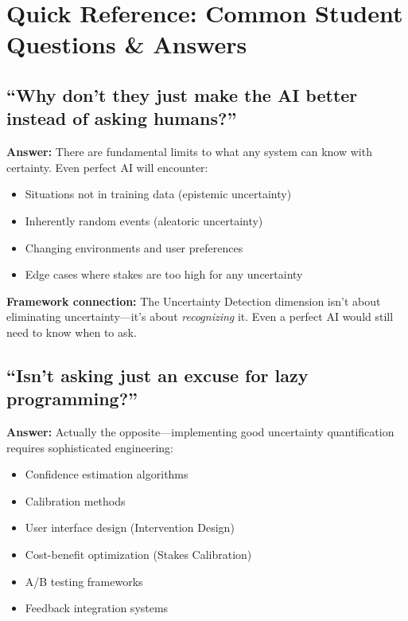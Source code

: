 \section{Quick Reference: Common Student Questions \& Answers}

\subsection{``Why don't they just make the AI better instead of asking humans?''}

\textbf{Answer:} There are fundamental limits to what any system can know with certainty. Even perfect AI will encounter:
\begin{itemize}
    \item Situations not in training data (epistemic uncertainty)
    \item Inherently random events (aleatoric uncertainty)
    \item Changing environments and user preferences
    \item Edge cases where stakes are too high for any uncertainty
\end{itemize}

\textbf{Framework connection:} The Uncertainty Detection dimension isn't about eliminating uncertainty---it's about \emph{recognizing} it. Even a perfect AI would still need to know when to ask.

\subsection{``Isn't asking just an excuse for lazy programming?''}

\textbf{Answer:} Actually the opposite---implementing good uncertainty quantification requires sophisticated engineering:
\begin{itemize}
    \item Confidence estimation algorithms
    \item Calibration methods
    \item User interface design (Intervention Design)
    \item Cost-benefit optimization (Stakes Calibration)
    \item A/B testing frameworks
    \item Feedback integration systems
\end{itemize}

